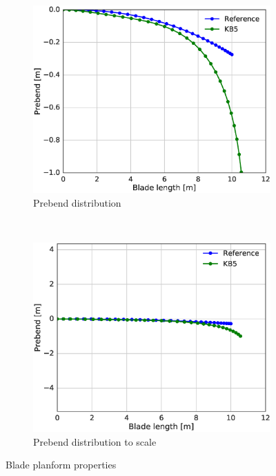 \begin{figure}[tph]
\begin{subfigure}{0.50\textwidth}
\includegraphics[width=\linewidth]{figures/KB6_final/KB5_prebend.eps}
\caption{Prebend distribution}
\label{subfig:KB5_prebend}
\end{subfigure}
 ~
\begin{subfigure}{0.50\textwidth}
\includegraphics[width=\linewidth]{figures/KB6_final/KB5_prebend_scale.eps}
\caption{Prebend distribution to scale}
\label{subfig:KB5_prebend_scale}
\end{subfigure}

\caption{Blade planform properties}
\label{fig:KB5_sweep_prebend}
\end{figure}

